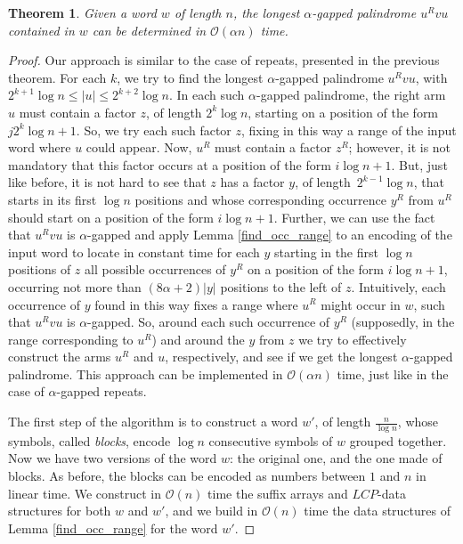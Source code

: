 \documentclass[final]{dmtcs-episciences}
\newcommand{\bigo}{{\mathcal O}}
\newcommand{\LCP}{{\mathit{LCP}}}
\newtheorem{theorem}{Theorem}
\begin{document}
\begin{theorem}\label{algorithm_case_aperiodic}
Given a word $w$ of length $n$, the longest $\alpha$-gapped palindrome $u^Rvu$ contained in $w$ can be determined in $\bigo(\alpha n)$ time. 
\end{theorem}
\begin{proof} 
Our approach is similar to the case of repeats, presented in the previous theorem. For each $k$, we try to find the longest $\alpha$-gapped palindrome $u^Rvu$, with $2^{k+1} \log n \leq |u| \leq 2^{k+2}\log n$. In each such $\alpha$-gapped palindrome, the right arm $u$ must contain a factor $z$, of length $2^k \log n$, starting on a position of the form $j2^k \log n+1$. So, we try each such factor $z$, fixing in this way a range of the input word where $u$ could appear. Now, $u^R$ must contain a factor $z^R$; however, it is not mandatory that this factor  occurs at a position of the form $i \log n+1$. But, just like before, it is not hard to see that $z$ has a factor $y$, of length~$2^{k-1}\log n$, that starts in its first $\log n$ positions and whose corresponding occurrence $y^R$ from $u^R$ should start on a position of the form $i \log n+1$. 
Further, we can use the fact that $u^Rvu$ is $\alpha$-gapped and apply Lemma \ref{find_occ_range} to an encoding of the input word to locate in constant time for each $y$ starting in the first $\log n$ positions of $z$ all possible occurrences of $y^R$ on a position of the form $i \log n+1$, occurring not more than $(8\alpha+2) |y|$ positions to the left of $z$. Intuitively, each occurrence of $y$ found in this way fixes a range where $u^R$ might occur in $w$, such that $u^Rvu$ is $\alpha$-gapped. So, around each such occurrence of $y^R$ (supposedly, in the range corresponding to $u^R$) and around the $y$ from $z$ we try to effectively construct the arms $u^R$ and $u$, respectively, and see if we get the longest $\alpha$-gapped palindrome. This approach can be implemented in $\bigo(\alpha n)$ time, just like in the case of $\alpha$-gapped repeats.

The first step of the algorithm is to construct a word $w'$, of length $\frac{n}{\log n}$, whose symbols, called {\em blocks}, encode $\log n $ consecutive symbols of $w$ grouped together. Now we have two versions of the word $w$: the original one, and the one made of blocks. As before, the blocks can be encoded as numbers between $1$ and $n$ in linear time. We construct in $\bigo(n)$ time the suffix arrays and $\LCP$-data structures for both $w$ and $w'$, and we build in $\bigo(n)$ time the data structures of Lemma \ref{find_occ_range} for the word $w'$.


\end{proof}
\end{document}
